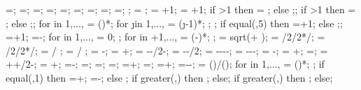 {{\pilediameter=\pilediameter;
\pilelinethickness=\pilelinethickness;
\latloadshift=\latloadshift;
\toparrlen=\toparrlen;
\basearrlen=\basearrlen;
\drift=\drift;
=;
=;
=;
;
\storyminone = ;
\columnnumber = \baynumber+1; %
\levelnumber = \storynumber+1; %
if \storynumber>1 then {\nlevmo = ;} else {;};
if \baynumber>1 then {\ncolmo = ;} else {;};
for \iii in {1,...,{\levelnumber}}{
\y{\iii} = ()*\storyheight;
for \j in {1,...,{\columnnumber}}{
\x{\j} = (\j-1)*\baywidth;
};
};
if equal(\showsupports,5) then
{=\subfloors+1;} else {;};
=+1;
\superstorynumber=\storynumber-\subfloors;
for \idefl in {1,...,{}}{
	 = 0;
};
for \idefl in {+1,...,{\levelnumber}}{
	 = (\idefl-)*\drift;
};
\tempdim = sqrt( + );
\fixbeamx = \collinet/2/2*/\tempdim;
\fixbeamy = \collinet/2/2*/\tempdim;
 =  / \storyheight * \baywidth;
 =  / \storyheight * \baywidth;
\rigbasestartx = -\supportwidth;
\rigbaseendx = \x{\columnnumber}+\supportwidth;
\isoboty = -\supportheight-\baselinet/2-\isolationdepth;
\isotopy = -\supportheight-\baselinet/2;
\foundboty = -\supportheight-\baselinet-\isolationdepth-\foundationdepth;
\foundtopy = -\supportheight-\baselinet-\isolationdepth;
\foundstartx = -\foundsidew;
\foundendx = \x{\columnnumber}+\foundsidew;
\structheight=\storynumber*\storyheight;
\isomidy = \supportheight+\isolinet+\isolationdepth/2-\baselinet;
\soilbelowfoundtof = \soilbelowfound+\supportheight;
\basewallstartx=-\supportwidth;
\buildingwidth=\baynumber*\baywidth;
\basewalldepth=\subfloors*\storyheight;
\basewallstarty=\basewalldepth;
\basewallendx=\buildingwidth+\supportwidth;
\basewallendy=\basewallstarty;
\rightsoilx=\buildingwidth+\rightsoildist;
\rightsoily=\basewalldepth-\rightsoildepth-\supportheight;
\isospace = (\buildingwidth)/();
for \kiso in {1,...,{\numberofisolators}}{
\xiso{\kiso} = ()*\isospace;
};
if equal(\isoshiftyn,1) then
{=+\isoshift;
\xiso{\numberofisolators}=\xiso{\numberofisolators}-\isoshift;}
else {};
if greater(\doflocfloor,\storynumber) then {;} else{};
if greater(\dofloccolumn,\columnnumber) then {;} else{};
}}
